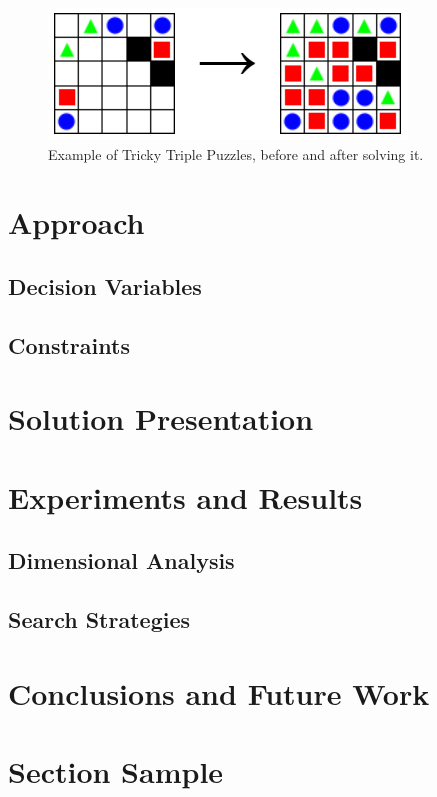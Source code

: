 \documentclass[runningheads]{llncs}
\begin{document}
\begin{figure}
    \includegraphics[width=\textwidth]{img/tricky-triple.png}
    \caption{Example of Tricky Triple Puzzles, before and after solving it.} \label{fig1}
\end{figure}

\section{Approach}
\subsection{Decision Variables}
\subsection{Constraints}

\section{Solution Presentation}

\section{Experiments and Results}
\subsection{Dimensional Analysis}
\subsection{Search Strategies}

\section{Conclusions and Future Work}

\section{Section Sample}
\end{document}
